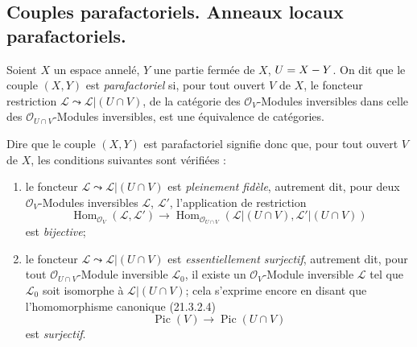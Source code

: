 \subsection{Couples parafactoriels. Anneaux locaux parafactoriels.}
\label{IV.21.13}

\begin{definition}[21.13.1]
Soient $X$ un espace annelé, $Y$ une partie fermée de $X$, $U=X- Y$.
On dit que le couple $(X,Y)$ est \emph{parafactoriel} si, pour tout ouvert $V$ de $X$,
le foncteur restriction
$\mathscr L\leadsto\mathscr L|(U\cap V)$, de la catégorie des
$\mathcal O_V$-Modules inversibles dans celle des $\mathcal O_{U\cap V}$-Modules
inversibles, est une équivalence de catégories.
\end{definition}

Dire que le couple $(X,Y)$ est parafactoriel signifie donc que, pour tout ouvert $V$
de $X$, les conditions suivantes sont vérifiées :
\begin{enumerate}[label=\arabic*\textsuperscript{o}]
  \item le foncteur $\mathscr L\leadsto\mathscr L|(U\cap V)$ est \emph{pleinement
  fidèle}, autrement dit, pour deux $\mathcal O_V$-Modules inversibles $\mathscr L$,
  $\mathscr L'$, l'application de restriction
  \[
    \operatorname{Hom}_{\mathcal O_V}(\mathscr L,\mathscr L')
    \longrightarrow
    \operatorname{Hom}_{\mathcal O_{U\cap V}}
    (\mathscr L|(U\cap V),\mathscr L'|(U\cap V))
  \]
  est \emph{bijective};
  \item le foncteur $\mathscr L\leadsto\mathscr L|(U\cap V)$ est
  \emph{essentiellement surjectif}, autrement dit, pour tout
  $\mathcal O_{U\cap V}$-Module inversible $\mathscr L_0$, il existe un
  $\mathcal O_V$-Module inversible $\mathscr L$ tel que $\mathscr L_0$ soit
  isomorphe à $\mathscr L|(U\cap V)$; cela s'exprime encore en disant que
  l'homomorphisme canonique (21.3.2.4)
  \[
    \operatorname{Pic}(V)\longrightarrow\operatorname{Pic}(U\cap V)
  \]
  est \emph{surjectif}.
\end{enumerate}

